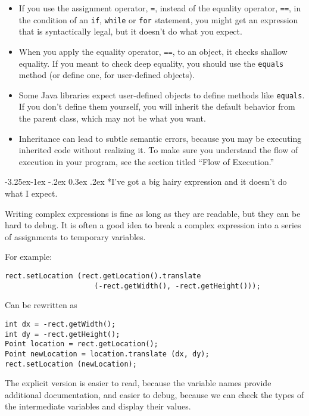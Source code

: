 \documentclass{book}
\makeatletter
\renewcommand\subsection{\@startsection {subsection}{2}{0mm}%
    {-3.25ex\@plus -1ex \@minus -.2ex}%
    {0.3ex \@plus .2ex}%
    {\normalfont\large\bfseries}}
\makeatother
\begin{document}
\begin{itemize}

\item If you use the assignment operator,
{\tt =}, instead of the equality operator, {\tt ==}, in the
condition of an {\tt if}, {\tt while} or {\tt for} statement,
you might get an expression that is syntactically legal, but
it doesn't do what you expect.

\item When you apply the equality operator, {\tt ==}, to an
object, it checks shallow equality.  If you meant to check
deep equality, you should use the {\tt equals} method (or
define one, for user-defined objects).

\item Some Java libraries expect user-defined objects to
define methods like {\tt equals}.  If you don't define them
yourself, you will inherit the default behavior from the parent
class, which may not be what you want.

\item Inheritance can lead to subtle semantic errors,
because you may be executing inherited code without realizing it.
To make sure you understand the flow of execution in your
program, see the section titled ``Flow of Execution.''

\end{itemize}


\subsection*{I've got a big hairy expression and it doesn't
do what I expect.}

Writing complex expressions is fine as long as they are readable,
but they can be hard to debug.  It is often a good idea to
break a complex expression into a series of assignments to
temporary variables.

For example:

\begin{verbatim}
rect.setLocation (rect.getLocation().translate
                     (-rect.getWidth(), -rect.getHeight()));
\end{verbatim}
%
Can be rewritten as

\begin{verbatim}
int dx = -rect.getWidth();
int dy = -rect.getHeight();
Point location = rect.getLocation();
Point newLocation = location.translate (dx, dy);
rect.setLocation (newLocation);
\end{verbatim}
%
The explicit version is easier to read, because the variable
names provide additional documentation, and easier to debug,
because we can check the types of the intermediate variables
and display their values.
\end{document}
